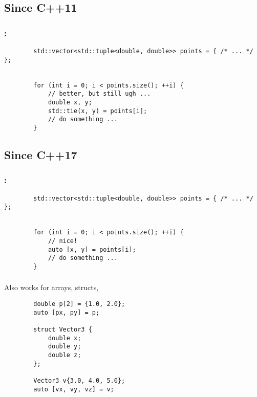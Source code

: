 \documentclass[aspectratio=43, t]{beamer}
\begin{document}
\subsection*{Since C++11}
\begin{frame}[fragile]
	\frametitle{\secname: \subsecname}

	\begin{verbatim}
		std::vector<std::tuple<double, double>> points = { /* ... */ };


		for (int i = 0; i < points.size(); ++i) {
			// better, but still ugh ...
			double x, y;
			std::tie(x, y) = points[i];
			// do something ...
		}
	\end{verbatim}
\end{frame}

\subsection*{Since C++17}
\begin{frame}[fragile]
	\frametitle{\secname: \subsecname}

	\begin{verbatim}
		std::vector<std::tuple<double, double>> points = { /* ... */ };


		for (int i = 0; i < points.size(); ++i) {
			// nice!
			auto [x, y] = points[i];
			// do something ...
		}
	\end{verbatim}
\end{frame}

\begin{frame}[fragile]
	\frametitle{\secname}

	Also works for arrays, structs, \textellipsis
	\begin{verbatim}
		double p[2] = {1.0, 2.0};
		auto [px, py] = p;

		struct Vector3 {
			double x;
			double y;
			double z;
		};

		Vector3 v{3.0, 4.0, 5.0};
		auto [vx, vy, vz] = v;
	\end{verbatim}
\end{frame}
\end{document}
